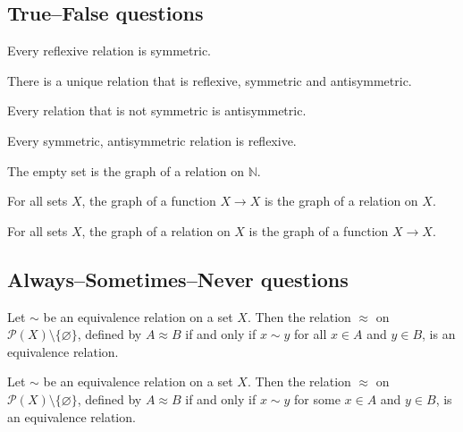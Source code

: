 \subsection*{True--False questions}


\begin{chapex} %
\label{cqRelationsTFBegin}
Every reflexive relation is symmetric.
\end{chapex}

\begin{chapex} %
There is a unique relation that is reflexive, symmetric and antisymmetric.
\end{chapex}

\begin{chapex} %
Every relation that is not symmetric is antisymmetric.
\end{chapex}

\begin{chapex} %
Every symmetric, antisymmetric relation is reflexive.
\end{chapex}

\begin{chapex} %
The empty set is the graph of a relation on $\mathbb{N}$.
\end{chapex}

\begin{chapex} %
For all sets $X$, the graph of a function $X \to X$ is the graph of a relation on $X$.
\end{chapex}

\begin{chapex} %
\label{cqRelationsTFEnd}
For all sets $X$, the graph of a relation on $X$ is the graph of a function $X \to X$.
\end{chapex}

\subsection*{Always--Sometimes--Never questions}


\begin{chapex} %
\label{cqRelationsASNBegin}
Let $\sim$ be an equivalence relation on a set $X$. Then the relation $\approx$ on $\mathcal{P}(X) \setminus \{ \varnothing \}$, defined by $A \approx B$ if and only if $x \sim y$ for all $x \in A$ and $y \in B$, is an equivalence relation.
\end{chapex}

\begin{chapex} %
\label{cqRelationsASNEnd}
Let $\sim$ be an equivalence relation on a set $X$. Then the relation $\approx$ on $\mathcal{P}(X) \setminus \{ \varnothing \}$, defined by $A \approx B$ if and only if $x \sim y$ for some $x \in A$ and $y \in B$, is an equivalence relation.
\end{chapex}